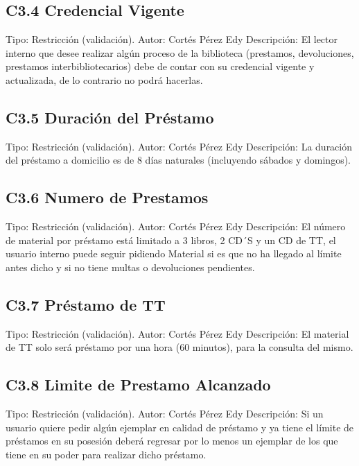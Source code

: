 \subsection{C3.4 Credencial Vigente }
	\UCli Tipo: Restricción (validación).
	\UCli Autor: Cortés Pérez Edy
	\UCli Descripción: El lector interno que desee realizar algún proceso de la biblioteca (prestamos, devoluciones, prestamos interbibliotecarios) debe de contar con su credencial vigente y actualizada, de lo contrario no podrá hacerlas.

\subsection{C3.5 Duración del Préstamo }
	\UCli Tipo: Restricción (validación).
	\UCli Autor: Cortés Pérez Edy
	\UCli Descripción: La duración del préstamo a domicilio es de 8 días naturales (incluyendo sábados y domingos).
	
\subsection{C3.6 Numero de Prestamos }
	\UCli Tipo: Restricción (validación).
	\UCli Autor: Cortés Pérez Edy
	\UCli Descripción: El número de material por préstamo está limitado a 3 libros, 2 CD´S y un CD de TT, el usuario interno puede seguir pidiendo Material si es que no ha llegado al límite antes dicho y si no tiene multas o devoluciones pendientes.
	
\subsection{C3.7 Préstamo de TT }
	\UCli Tipo: Restricción (validación).
	\UCli Autor: Cortés Pérez Edy
	\UCli Descripción: El material de TT solo será préstamo por una hora (60 minutos), para la consulta del mismo.

\subsection{C3.8 Limite de Prestamo Alcanzado }
	\UCli Tipo: Restricción (validación).
	\UCli Autor: Cortés Pérez Edy
	\UCli Descripción: Si un usuario quiere pedir algún ejemplar en calidad de préstamo y ya tiene el límite de préstamos en su posesión deberá regresar por lo menos un ejemplar de los que tiene en su poder para realizar dicho préstamo.

